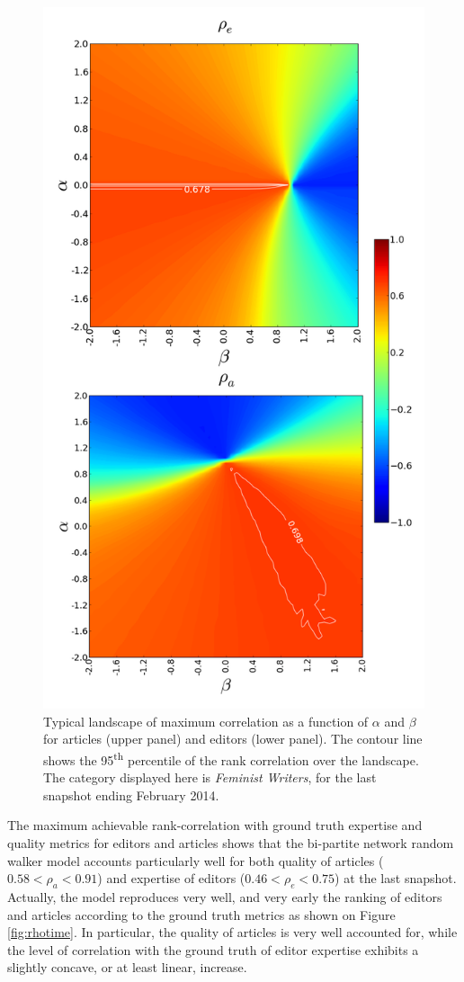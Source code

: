 \begin{figure}[!t]
\centering
\includegraphics[width=0.9\columnwidth]{../Figures/contour_fem_combined.png}
\caption{Typical landscape of maximum correlation as a function of $\alpha$ and $\beta$ for articles (upper panel) and editors (lower panel). The contour line shows the 95\textsuperscript{th} percentile of the rank correlation over the landscape. The category displayed here is {\it Feminist Writers}, for the last snapshot ending February 2014.}
\label{fig:landscape}
\end{figure}

The maximum achievable rank-correlation with ground truth expertise and quality metrics for editors \cite{geiger2013} and articles \cite{wang2013tell} shows that the bi-partite network random walker model accounts particularly well for both quality of articles ($0.58 < \rho_a < 0.91$) and expertise of editors ($0.46 < \rho_e < 0.75 $) at the last snapshot. Actually, the model reproduces very well, and very early the ranking of editors and articles according to the ground truth metrics as shown on Figure \ref{fig:rhotime}. In particular, the quality of articles is very well accounted for, while the level of correlation with the ground truth of editor expertise exhibits a slightly concave, or at least linear, increase.

